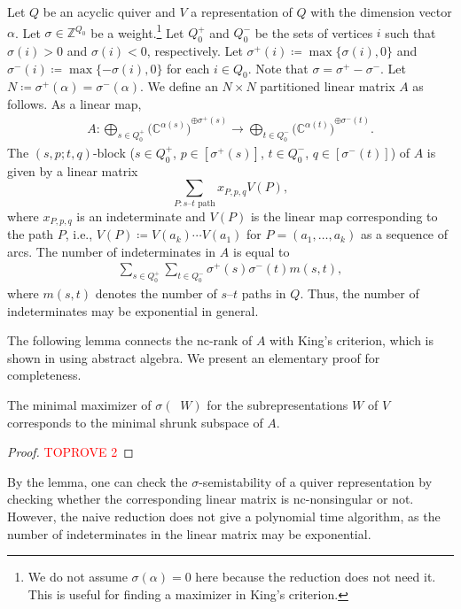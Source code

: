 \documentclass[a4paper,11pt]{article}
\numberwithin{equation}{section}
\newcommand{\C}{\mathbb{C}}
\newcommand{\Z}{\mathbb{Z}}
\DeclareMathOperator{\dimv}{\underline{dim}}
\begin{document}
Let $Q$ be an acyclic quiver and $V$ a representation of $Q$ with the dimension vector $\alpha$.
Let $\sigma \in \Z^{Q_0}$ be a weight.\footnote{We do not assume $\sigma(\alpha) = 0$ here because the reduction does not need it. This is useful for finding a maximizer in King's criterion.}
Let $Q_0^+$ and $Q_0^-$ be the sets of vertices $i$ such that $\sigma(i) > 0$ and $\sigma(i) < 0$, respectively.
Let $\sigma^+(i) \coloneqq \max\{\sigma(i), 0\}$ and $\sigma^-(i) \coloneqq \max\{-\sigma(i), 0\}$ for each $i \in Q_0$.
Note that $\sigma = \sigma^+ - \sigma^-$.
Let $N \coloneqq \sigma^+(\alpha) = \sigma^-(\alpha)$.
We define an $N \times N$ partitioned linear matrix $A$ as follows.
As a linear map, 
\begin{align}\label{eq:A-Derksen2017}
    A: \bigoplus_{s \in Q_0^+} {\bigl(\C^{\alpha(s)}\bigr)}^{\oplus \sigma^+(s)} \to \bigoplus_{t \in Q_0^-} {\bigl(\C^{\alpha(t)}\bigr)}^{\oplus \sigma^-(t)}.
\end{align}
The $(s,p;t,q)$-block ($s \in Q_0^+$, $p \in [\sigma^+(s)]$, $t \in Q_0^-$, $q \in [\sigma^-(t)]$) of $A$ is given by a linear matrix
\[
    \sum_{P: \text{$s$--$t$ path}} x_{P,p,q} V(P),
\]
where $x_{P,p,q}$ is an indeterminate and $V(P)$ is the linear map corresponding to the path $P$, i.e., $V(P) \coloneqq V(a_k) \cdots V(a_1)$ for $P = (a_1, \dots, a_k)$ as a sequence of arcs.
The number of indeterminates in $A$ is equal to 
\begin{align}
    \sum_{s \in Q_0^+} \sum_{t \in Q_0^-} \sigma^+(s)\sigma^-(t) m(s,t),
\end{align}
where $m(s,t)$ denotes the number of $s$--$t$ paths in $Q$.
Thus, the number of indeterminates may be exponential in general.

The following lemma connects the nc-rank of $A$ with King's criterion, which is shown in \citep[Theorem~3.3]{Huszar2021} using abstract algebra.
We present an elementary proof for completeness. 

\begin{lemma}\label{lem:shrunk-King}
    The minimal maximizer of $\sigma(\dimv W)$ for the subrepresentations $W$ of $V$ corresponds to the minimal shrunk subspace of $A$.
\end{lemma}
\begin{proof}\textcolor{red}{TOPROVE 2}\end{proof}

By the lemma, one can check the $\sigma$-semistability of a quiver representation by checking whether the corresponding linear matrix is nc-nonsingular or not.
However, the naive reduction does not give a polynomial time algorithm, as the number of indeterminates in the linear matrix may be exponential.
\end{document}
